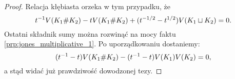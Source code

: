\begin{proof}
\begin{comment}
            \node at (-17, 0) {$K_1$};
            \node at (17, 0) {$K_2$};
        \end{knot}
        \end{tikzpicture}
    \]
\end{comment}
    Relacja kłębiasta orzeka w tym przypadku, że
    \begin{equation}
        t^{-1} V(K_1 \# K_2) - t V(K_1 \# K_2) + (t^{-1/2} - t^{1/2}) V(K_1 \sqcup K_2) = 0.
    \end{equation}
    Ostatni składnik sumy można rozwinąć na mocy faktu \ref{prp:jones_multiplicative_1}.
    Po uporządkowaniu dostaniemy:
    \begin{equation}
        (t^{-1} - t) V(K_1 \# K_2) - (t^{-1} - t) V(K_1) V(K_2) = 0,
    \end{equation}
    a stąd widać już prawdziwość dowodzonej tezy.
\end{proof}



